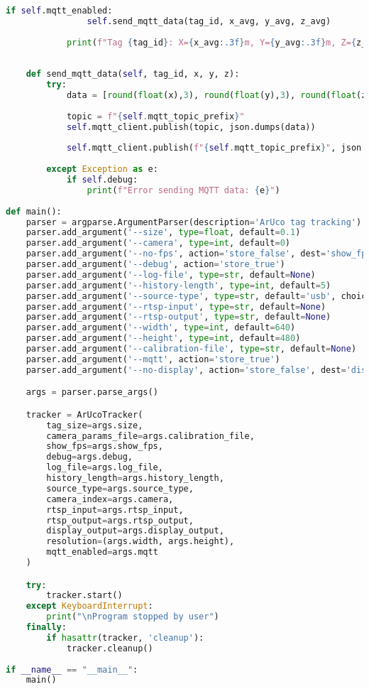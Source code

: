 \begin{lstlisting}[language=Python]
            if self.mqtt_enabled:
                self.send_mqtt_data(tag_id, x_avg, y_avg, z_avg)
    
            print(f"Tag {tag_id}: X={x_avg:.3f}m, Y={y_avg:.3f}m, Z={z_avg:.3f}m", end="\r")
    
    
    def send_mqtt_data(self, tag_id, x, y, z):
        try:
            data = [round(float(x),3), round(float(y),3), round(float(z),3)]
    
            topic = f"{self.mqtt_topic_prefix}"
            self.mqtt_client.publish(topic, json.dumps(data))
    
            self.mqtt_client.publish(f"{self.mqtt_topic_prefix}", json.dumps(data))
    
        except Exception as e:
            if self.debug:
                print(f"Error sending MQTT data: {e}")
        
def main():
    parser = argparse.ArgumentParser(description='ArUco tag tracking')
    parser.add_argument('--size', type=float, default=0.1)
    parser.add_argument('--camera', type=int, default=0)
    parser.add_argument('--no-fps', action='store_false', dest='show_fps')
    parser.add_argument('--debug', action='store_true')
    parser.add_argument('--log-file', type=str, default=None)
    parser.add_argument('--history-length', type=int, default=5)
    parser.add_argument('--source-type', type=str, default='usb', choices=['usb', 'picamera', 'rtsp'])
    parser.add_argument('--rtsp-input', type=str, default=None)
    parser.add_argument('--rtsp-output', type=str, default=None)
    parser.add_argument('--width', type=int, default=640)
    parser.add_argument('--height', type=int, default=480)
    parser.add_argument('--calibration-file', type=str, default=None)
    parser.add_argument('--mqtt', action='store_true')
    parser.add_argument('--no-display', action='store_false', dest='display_output')

    args = parser.parse_args()

    tracker = ArUcoTracker(
        tag_size=args.size,
        camera_params_file=args.calibration_file,
        show_fps=args.show_fps,
        debug=args.debug,
        log_file=args.log_file,
        history_length=args.history_length,
        source_type=args.source_type,
        camera_index=args.camera,
        rtsp_input=args.rtsp_input,
        rtsp_output=args.rtsp_output,
        display_output=args.display_output,
        resolution=(args.width, args.height),
        mqtt_enabled=args.mqtt
    )

    try:
        tracker.start()
    except KeyboardInterrupt:
        print("\nProgram stopped by user")
    finally:
        if hasattr(tracker, 'cleanup'):
            tracker.cleanup()
        
if __name__ == "__main__":
    main()
\end{lstlisting}

\endinput